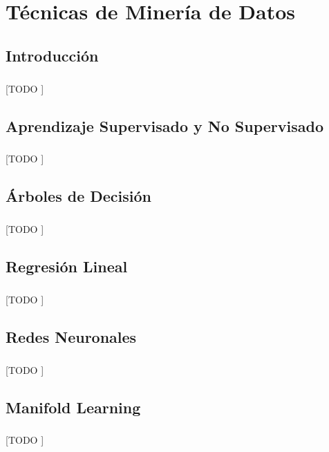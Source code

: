 \documentclass{subfiles}
\begin{document}
  \chapter{Técnicas de Minería de Datos}
  \label{chap:mining}

    \section{Introducción}
    \label{sec:mining_intro}

      \paragraph{}
      [TODO ]

    \section{Aprendizaje Supervisado y No Supervisado}
    \label{sec:supervised_unsupervised}

      \paragraph{}
      [TODO ]

    \section{Árboles de Decisión}
    \label{sec:decision_trees}

      \paragraph{}
      [TODO ]

    \section{Regresión Lineal}
    \label{sec:linear_regression}

      \paragraph{}
      [TODO ]

    \section{Redes Neuronales}
    \label{sec:neural_networks}

      \paragraph{}
      [TODO ]

    \section{Manifold Learning}
    \label{sec:manifold_learning}

      \paragraph{}
      [TODO ]
\end{document}

